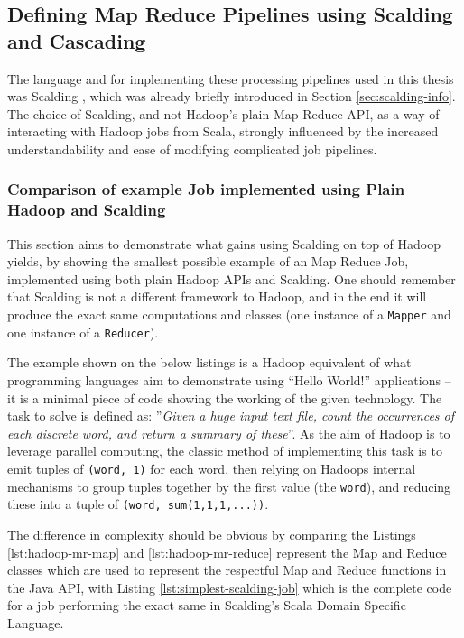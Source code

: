 \subsection{Defining Map Reduce Pipelines using Scalding and Cascading}
\label{sec:scalding-jobs}
The language and for implementing these processing pipelines used in this thesis was Scalding \cite{scalding}, which was already briefly introduced in Section \ref{sec:scalding-info}. The choice of Scalding, and not Hadoop's plain Map Reduce API, as a way of interacting with Hadoop jobs from Scala, strongly influenced by the increased understandability and ease of modifying complicated job pipelines. 

\subsubsection{Comparison of example Job implemented using Plain Hadoop and Scalding}

This section aims to demonstrate what gains using Scalding on top of Hadoop yields, by showing the smallest possible example of an Map Reduce Job, implemented using both plain Hadoop APIs and Scalding. One should remember that Scalding is not a different framework to  Hadoop, and in the end it will produce the exact same computations and classes (one instance of a \verb|Mapper| and one instance of a \verb|Reducer|).

The example shown on the below listings is a Hadoop equivalent of what programming languages aim to demonstrate using ``Hello World!'' applications -- it is a minimal piece of code showing the working of the given technology. The task to solve is defined as: ''\textit{Given a huge input text file, count the occurrences of each discrete word, and return a summary of these}''. As the aim of Hadoop is to leverage parallel computing, the classic method of implementing this task is to emit tuples of \verb|(word, 1)| for each word, then relying on Hadoops internal mechanisms to group tuples together by the first value (the \verb|word|), and reducing these into a tuple of \verb|(word, sum(1,1,1,...))|.

The difference in complexity should be obvious by comparing the Listings \ref{lst:hadoop-mr-map} and \ref{lst:hadoop-mr-reduce} represent the Map and Reduce classes which are used to represent the respectful Map and Reduce functions in the Java API, with Listing \ref{lst:simplest-scalding-job} which is the complete code for a job performing the exact same in Scalding's Scala Domain Specific Language. 

